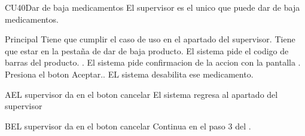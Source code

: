 \begin{UseCase}{CU40}{Dar de baja medicamentos}{
		El supervisor es el unico que puede dar de baja medicamentos.
	}
	\end{UseCase}
	\begin{UCtrayectoria}{Principal}
		\UCpaso[\UCactor] Tiene que cumplir el caso de uso  en el apartado del supervisor.
		\UCpaso[\UCactor] Tiene que estar en la pestaña de dar de baja producto.
		\UCpaso El sistema  pide el codigo de barras del producto. .
		\UCpaso El sistema pide confirmacion de la accion con la pantalla .
		\UCpaso Presiona el boton Aceptar..
		\UCpaso EL sistema desabilita ese medicamento.
	\end{UCtrayectoria}

	\begin{UCtrayectoriaA}{A}{EL supervisor da en el boton cancelar}
			\UCpaso El sistema regresa al apartado del supervisor
		\end{UCtrayectoriaA}
		\begin{UCtrayectoriaA}{B}{EL supervisor da en el boton cancelar}
			\UCpaso[] Continua en el paso 3 del .
		\end{UCtrayectoriaA}		
		